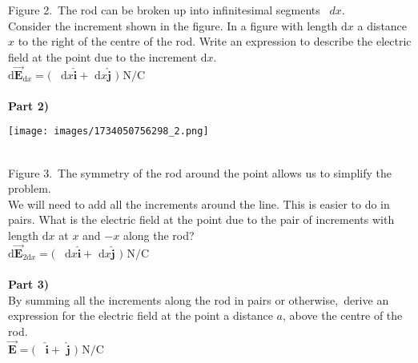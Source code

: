 \documentclass[addpoints,12pt, margin-left=35px]{exam}
\begin{document}
Figure 2. The rod can be broken up into infinitesimal segments  $ dx $. \\

Consider the increment shown in the figure. In a figure with length $\mathrm{d} x$ a distance $x$ to the right of the centre of the rod. Write an expression to describe the electric field at the point due to the increment $\mathrm{d} x.$\\

$\mathrm{d} \mathbf{\vec{E}}_{\mathrm{d} x} = ($  \underline{\hspace{3cm}}  $ \mathrm{d} x \mathbf{\hat{i}} + $  \underline{\hspace{3cm}}  $\mathrm{d} x \mathbf{\hat{j}} \text{ ) N/C}$ \\

\\

\textbf{Part 2)}\\

\begin{center}
\texttt{[image: images/1734050756298\_2.png]}
\end{center}\\

Figure 3. The symmetry of the rod around the point allows us to simplify the problem.\\

We will need to add all the increments around the line. This is easier to do in pairs. What is the electric field at the point due to the pair of increments with length $\mathrm{d} x$ at $x$ and $-x$ along the rod?\\

$\mathrm{d} \mathbf{\vec{E}}_{2 \mathrm{d} x} = ( $  \underline{\hspace{3cm}}  $\mathrm{d} x \mathbf{\hat{i}} + $  \underline{\hspace{3cm}}  $\mathrm{d} x \mathbf{\hat{j}} \text{ ) N/C}$ \\

\\

\textbf{Part 3)}\\

By summing all the increments along the rod in pairs or otherwise, derive an expression for the electric field at the point a distance $ a$, above the centre of the rod.\\

$\mathbf{\vec{E}} = ($  \underline{\hspace{3cm}}  $ \mathbf{\hat{i}} + $  \underline{\hspace{3cm}}  $\mathbf{\hat{j}} \text{ ) N/C}$ \\
\end{document}
